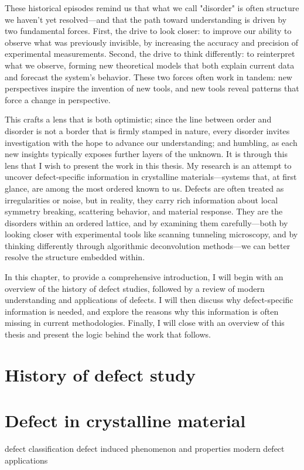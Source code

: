 These historical episodes remind us that what we call "disorder" is often structure we haven't yet resolved—and that the path toward understanding is driven by two fundamental forces. First, the drive to look closer: to improve our ability to observe what was previously invisible, by increasing the accuracy and precision of experimental measurements. Second, the drive to think differently: to reinterpret what we observe, forming new theoretical models that both explain current data and forecast the system’s behavior. These two forces often work in tandem: new perspectives inspire the invention of new tools, and new tools reveal patterns that force a change in perspective.

This crafts a lens that is both optimistic; since the line between order and disorder is not a border that is firmly stamped in nature, every disorder invites investigation with the hope to advance our understanding; and humbling, as each new insights typically exposes further layers of the unknown. It is through this lens that I wish to present the work in this thesis. My research is an attempt to uncover defect-specific information in crystalline materials—systems that, at first glance, are among the most ordered known to us. Defects are often treated as irregularities or noise, but in reality, they carry rich information about local symmetry breaking, scattering behavior, and material response. They are the disorders within an ordered lattice, and by examining them carefully—both by looking closer with experimental tools like scanning tunneling microscopy, and by thinking differently through algorithmic deconvolution methods—we can better resolve the structure embedded within. 

In this chapter, to provide a comprehensive introduction, I will begin with an overview of the history of defect studies, followed by a review of modern understanding and applications of defects. I will then discuss why defect-specific information is needed, and explore the reasons why this information is often missing in current methodologies. Finally, I will close with an overview of this thesis and present the logic behind the work that follows.

\section{History of defect study}

\section{Defect in crystalline material}
defect classification
defect induced phenomenon and properties
modern defect applications
